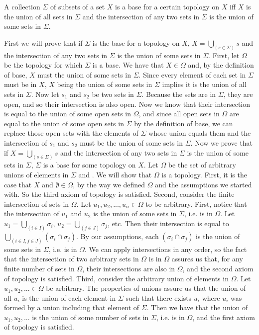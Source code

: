 \begin{majorEx}%
A collection $\Sigma$ of subsets of a set $X$ is a base for a certain topology on $X$ iff $X$ is the union of all sets in $\Sigma$ and
the intersection of any two sets in $\Sigma$ is the union of some sets in $\Sigma$.
\end{majorEx}
First we will prove that if $\Sigma$ is the base for a topology on $X$, $X = \bigcup_(s \in \Sigma) s$ and the intersection of any two sets in $\Sigma$ is the union of some sets in $\Sigma$. First, let $\Omega$ be the topology for which $\Sigma$ is a base. We have that $X \in \Omega$ and, by the definition of base, $X$ must the union of some sets in $\Sigma$. Since every element of each set in $\Sigma$ must be in $X$, $X$ being the union of some sets in $\Sigma$ implies it is the union of all sets in $\Sigma$. Now let $s_1$ and $s_2$ be two sets in $\Sigma$. Because the sets are in $\Sigma$, they are open, and so their intersection is also open. Now we know that their intersection is equal to the union of some open sets in $\Omega$, and since all open sets in $\Omega$ are equal to the union of some open sets in $\Sigma$ by the definition of base, we can replace those open sets with the elements of $\Sigma$ whose union equals them and the intersection of $s_1$ and $s_2$ must be the union of some sets in $\Sigma$.
Now we prove that if $X = \bigcup_(s \in \Sigma) s$ and the intersection of any two sets in $\Sigma$ is the union of some sets in $\Sigma$, $\Sigma$ is a base for some topology on $X$. Let $\Omega$ be the set of arbitrary unions of elements in $\Sigma$ and \emptyset. We will show that $\Omega$ is a topology.
First, it is the case that $X$ and $\emptyset \in \Omega$, by the way we defined $\Omega$ and the assumptions we started with. So the third axiom of topology is satisfied.
Second, consider the finite intersection of sets in $\Omega$. Let $u_1, u_2, ..., u_n \in \Omega$ to be arbitrary. First, notice that the intersection of $u_1$ and $u_2$ is the union of some sets in $\Sigma$, i.e. is in $\Omega$. Let $u_1 = \bigcup_(i \in I) \sigma_i$, $u_2= \bigcup_(j \in J) \sigma_j$, etc. Then their intersection is equal to $\bigcup_(i \in I, j \in J) (\sigma_i \cap \sigma_j)$. By our assumptions, each $(\sigma_i \cap \sigma_j)$ is the union of some sets in $\Sigma$, i.e. is in $\Omega$. We can apply intersections in any order, so the fact that the intersection of two arbitrary sets in $\Omega$ is in $\Omega$ assures us that, for any finite number of sets in $\Omega$, their intersections are also in $\Omega$, and the second axiom of topology is satisfied.
Third, consider the arbitrary union of elements in $\Omega$. Let $u_1, u_2, ... \in \Omega$ be arbitrary. The properties of unions assure us that the union of all $u_i$ is the union of each element in $\Sigma$ such that there exists $u_i$ where $u_i$ was formed by a union including that element of $\Sigma$. Then we have that the union of $u_1, u_2, ...$ is the union of some number of sets in $\Sigma$, i.e. is in $\Omega$, and the first axiom of topology is satisfied.

